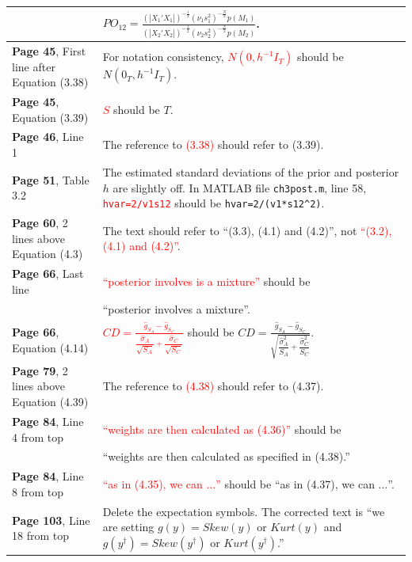 \documentclass[10pt, a4paper]{article}
\newcommand{\red}[1]{\textcolor{red}{#1}}
\newcommand{\green}[1]{\textcolor{green!50!black}{#1}}
\begin{document}
\begin{longtable}{|R{.36\textwidth}|R{.58\textwidth}|}
	& \green{$\displaystyle PO_{12}=\frac{(|X_1'X_1|)^{-\frac{1}{2}}(\nu_1s_1^2)^{-\frac{N}{2}}p(M_1)}{(|X_2'X_2|)^{-\frac{1}{2}}(\nu_2s_2^2)^{-\frac{N}{2}}p(M_2)}$}. \\ \hline
	\textbf{Page 45}, First line after Equation (3.38) & For notation consistency, \red{$N(0,h^{-1}I_T)$} should be \green{$N(0_T,h^{-1}I_T)$}. \\ \hline	
	\textbf{Page 45}, Equation (3.39) & \red{$S$} should be \green{$T$}. \\ \hline	
	\textbf{Page 46}, Line 1 & The reference to \red{(3.38)} should refer to \green{(3.39)}. \\ \hline	
	\textbf{Page 51}, Table 3.2 & The estimated standard deviations of the prior and posterior $h$ are slightly off. In MATLAB file \texttt{ch3post.m}, line 58, \red{\texttt{hvar=2/v1s12}} should be \green{\texttt{hvar=2/(v1*s12\textasciicircum2)}}. \\ \hline	
	\textbf{Page 60}, 2 lines above Equation (4.3) & The text should refer to \green{``(3.3), (4.1) and (4.2)''}, not \red{``(3.2), (4.1) and (4.2)''}. \\ \hline
	\textbf{Page 66}, Last line & \red{``posterior involves is a mixture''} should be \\
	& \green{``posterior involves a mixture''}. \\ \hline	
	\textbf{Page 66}, Equation (4.14) & \red{$\displaystyle CD=\frac{\widehat{g}_{S_A}-\widehat{g}_{S_C}}{\dfrac{\widehat{\sigma}_A}{\sqrt{S_A}}+\dfrac{\widehat{\sigma}_C}{\sqrt{S_C}}}$} should be \green{$\displaystyle CD=\frac{\widehat{g}_{S_A}-\widehat{g}_{S_C}}{\sqrt{\dfrac{\widehat{\sigma}_A^2}{S_A}+\dfrac{\widehat{\sigma}_C^2}{S_C}}}$}. \\ \hline	
	\textbf{Page 79}, 2 lines above Equation (4.39) & The reference to \red{(4.38)} should refer to \green{(4.37)}. \\ \hline	
	\textbf{Page 84}, Line 4 from top & \red{``weights are then calculated as (4.36)''}  should be \\
	& \green{``weights are then calculated as specified in (4.38).''} \\ \hline	
	\textbf{Page 84}, Line 8 from top &  \red{``as in (4.35), we can $\ldots$''} should  be \green{``as in (4.37), we can $\ldots$''}. \\ \hline	
	\textbf{Page 103}, Line 18 from top & Delete the expectation symbols. The corrected text is \green{``we are setting $g(y)=Skew(y)$ or $Kurt(y)$ and $g(y^\dagger)=Skew(y^\dagger)$ or $Kurt(y^\dagger)$.''} \\ \hline	

\end{longtable}
\end{document}
